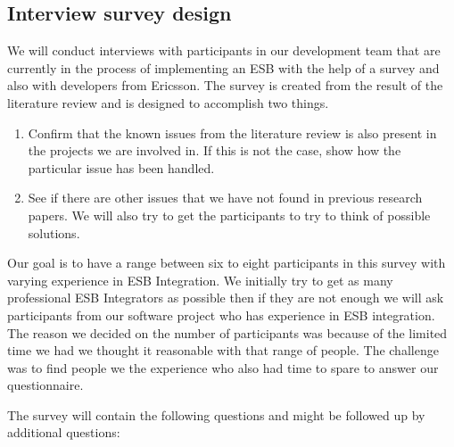 \documentclass{llncs}
\begin{document}
\subsection{Interview survey design}

We will conduct interviews with participants in our development team that are currently in the process of implementing an ESB with the help of a survey and also with developers from Ericsson. The survey is created from the result of the literature review and is designed to accomplish two things.
\begin{enumerate}
\item Confirm that the known issues from the literature review is also present in the projects we are involved in. If this is not the case, show how the particular issue has been handled.
\item See if there are other issues that we have not found in previous research papers. We will also try to get the participants to try to think of possible solutions.
\end{enumerate}
Our goal is to have a range between six to eight participants in this survey with varying experience in ESB Integration. We initially try to get as many professional ESB Integrators as possible then if they are not enough we will ask participants from our software project who has experience in ESB integration. The reason we decided on the number of participants was because of the limited time we had we thought it reasonable with that range of people. The challenge was to find people we the experience who also had time to spare to answer our questionnaire. 

The survey will contain the following questions and might be followed up by additional questions:
\end{document}
